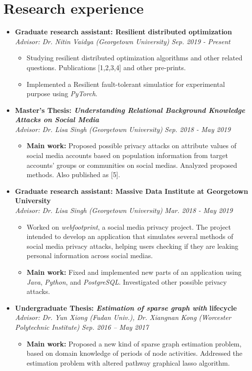 \documentclass[letterpaper,11pt]{article}
\makeatletter
\newcommand{\resumeItem}[2]{
  \vspace{-3pt}
  \item{
    \textbf{#1}{#2}
  }
}
\newcommand{\resumeSubheading}[4]{
  \vspace{-7pt}\item
      \textbf{#1} \hfill #2 \\
      \textit{\small#3} \hfill \textit{\small #4}
  \vspace{-4pt}
}
\newcommand{\resumeSubHeadingListStart}{\begin{itemize}[leftmargin=*]}
\newcommand{\resumeSubHeadingListEnd}{\end{itemize}}
\newcommand{\resumeItemListStart}{\begin{itemize}}
\newcommand{\resumeItemListEnd}{\end{itemize}\vspace{-5pt}}
\makeatother
\begin{document}
\section{Research experience}
  \resumeSubHeadingListStart
    \resumeSubheading
      {Graduate research assistant: Resilient distributed optimization}{}
      {\emph{Advisor: Dr. Nitin Vaidya (Georgetown University)}}{Sep. 2019 - Present}
      \resumeItemListStart
        \resumeItem{}
          {Studying resilient distributed optimization algorithms and other related questions. Publications [1,2,3,4] and other pre-prints.}
        \resumeItem{}
          {Implemented a Resilient fault-tolerant simulatior for experimental purpose using \textit{PyTorch}.}
      \resumeItemListEnd

    \resumeSubheading
      {Master's Thesis: \emph{Understanding Relational Background Knowledge Attacks on Social Media}}{}
      {\emph{Advisor: Dr. Lisa Singh (Georgetown University)}}{Sep. 2018 - May 2019}
      \resumeItemListStart
        \resumeItem{Main work: }
          {Proposed possible privacy attacks on attribute values of social media accounts based on population information from target accounts' groups or communities on social medias. Analyzed proposed methods. Also published as [5].}
      \resumeItemListEnd

    \resumeSubheading
      {Graduate research assistant: Massive Data Institute at Georgetown University}{}
      {\emph{Advisor: Dr. Lisa Singh (Georgetown University)}}{Mar. 2018 - May 2019}
      \resumeItemListStart
        \resumeItem{}
          {Worked on \emph{webfootprint}, a social media privacy project. The project intended to develop an application that simulates several methods of social media privacy attacks, helping users checking if they are leaking personal information across social medias.}
        \resumeItem{Main work: }
          {Fixed and implemented new parts of an application using \textit{Java}, \textit{Python}, and \textit{PostgreSQL}. Investigated other possible privacy attacks.}
      \resumeItemListEnd

    \resumeSubheading
      {Undergraduate Thesis: \emph{Estimation of sparse graph with} lifecycle}{}
      {\emph{Advisor: Dr. Yun Xiong (Fudan Univ.), Dr. Xiangnan Kong (Worcester Polytechnic Institute)}}{Sep. 2016 -- May 2017}
      \resumeItemListStart
        \resumeItem{Main work: }
          {Proposed a new kind of sparse graph estimation problem, based on domain knowledge of periods of node activities. Addressed the estimation problem with altered pathway graphical lasso algorithm.}
      \resumeItemListEnd
  \resumeSubHeadingListEnd
\end{document}

